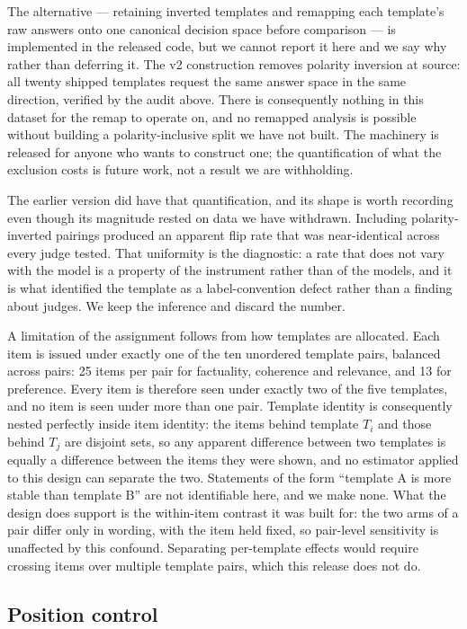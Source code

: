 The alternative --- retaining inverted templates and remapping each template's
raw answers onto one canonical decision space before comparison --- is
implemented in the released code, but we cannot report it here and we say why
rather than deferring it. The v2 construction removes polarity inversion at
source: all twenty shipped templates request the same answer space in the same
direction, verified by the audit above. There is consequently nothing in this
dataset for the remap to operate on, and no remapped analysis is possible without
building a polarity-inclusive split we have not built. The machinery is released
for anyone who wants to construct one; the quantification of what the exclusion
costs is future work, not a result we are withholding.

The earlier version did have that quantification, and its shape is worth
recording even though its magnitude rested on data we have withdrawn. Including
polarity-inverted pairings produced an apparent flip rate that was near-identical
across every judge tested. That uniformity is the diagnostic: a rate that does
not vary with the model is a property of the instrument rather than of the
models, and it is what identified the template as a label-convention defect
rather than a finding about judges. We keep the inference and discard the number.

A limitation of the assignment follows from how templates are allocated. Each
item is issued under exactly one of the ten unordered template pairs, balanced
across pairs: 25 items per pair for factuality, coherence and relevance, and 13
for preference. Every item is therefore seen under exactly two of the five
templates, and no item is seen under more than one pair. Template identity is
consequently nested perfectly inside item identity: the items behind template
$T_i$ and those behind $T_j$ are disjoint sets, so any apparent difference
between two templates is equally a difference between the items they were shown,
and no estimator applied to this design can separate the two. Statements of the
form ``template A is more stable than template B'' are not identifiable here,
and we make none. What the design does support is the within-item contrast it
was built for: the two arms of a pair differ only in wording, with the item held
fixed, so pair-level sensitivity is unaffected by this confound. Separating
per-template effects would require crossing items over multiple template pairs,
which this release does not do.

\subsection{Position control}

